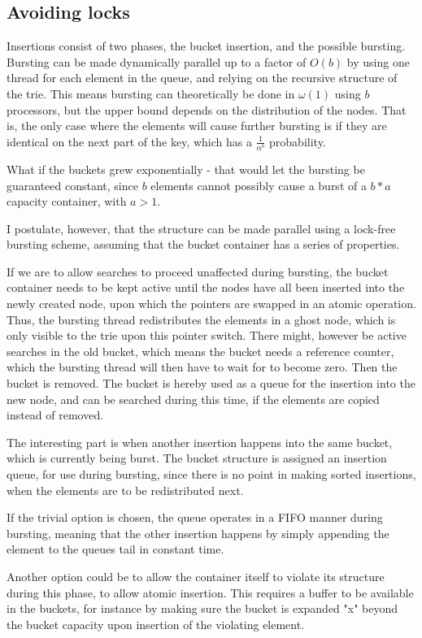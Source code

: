 \subsection{Avoiding locks}
Insertions consist of two phases, the bucket insertion, and the possible
bursting. Bursting can be made dynamically parallel up to a factor of $O(b)$ by
using one thread for each element in the queue, and relying on the recursive
structure of the trie. This means bursting can theoretically be done in
$\omega(1)$ using $b$ processors, but the upper bound depends on the
distribution of the nodes. That is, the only case where the elements will cause
further bursting is if they are identical on the next part of the key, which
has a $\frac{1}{\alpha^b}$ probability.

What if the buckets { grew exponentially} - that would let the bursting be
guaranteed constant, since $b$ elements cannot possibly cause a burst of a
$b*a$ capacity container, with $a > 1$.


I postulate, however, that the structure can be made parallel using a lock-free
bursting scheme, assuming that the bucket container has a series of properties.

If we are to allow searches to proceed unaffected during bursting, the bucket
container needs to be kept active until the nodes have all been inserted into the
newly created node, upon which the pointers are swapped in an atomic operation.
Thus, the bursting thread redistributes the elements in a ghost node, which is
only visible to the trie upon this pointer switch. There might, however be
active searches in the old bucket, which means the bucket needs a reference
counter, which the bursting thread will then have to wait for to become zero.
Then the bucket is removed. The bucket is hereby used as a queue for the
insertion into the new node, and can be searched during this time, if the
elements are copied instead of removed.

The interesting part is when another insertion happens into the same bucket,
which is currently being burst. The bucket structure is assigned an insertion
queue, for use during bursting, since there is no point in making sorted
insertions, when the elements are to be redistributed next.

If the trivial option is chosen, the queue
operates in a FIFO manner during bursting, meaning that the other insertion
happens by simply appending the element to the queues tail in constant time.

Another option could be to allow the container itself to violate its structure
during this phase, to allow atomic insertion.
This requires a buffer to be available in the buckets, for instance by making
sure the bucket is expanded "x" beyond the bucket capacity upon insertion of
the violating element.

